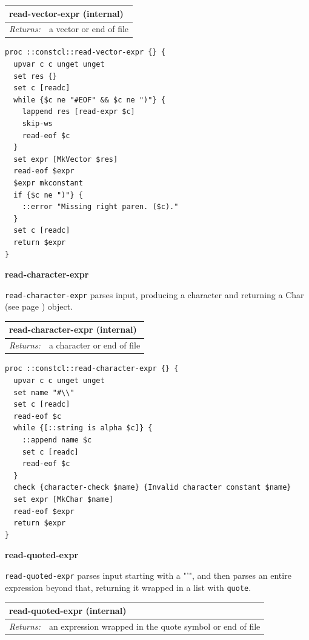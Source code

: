 \documentclass[twoside,9pt]{report}
\begin{document}
\begin{tabular}{ |l l| }
\hline
\multicolumn{2}{|l|}{read-vector-expr (internal)} \\
\hline
\textit{Returns:} & a vector or end of file \\
\hline
\end{tabular}

\noindent\makebox[\linewidth]{\rule{\linewidth}{0.4pt}}
\begin{lstlisting}
proc ::constcl::read-vector-expr {} {
  upvar c c unget unget
  set res {}
  set c [readc]
  while {$c ne "#EOF" && $c ne ")"} {
    lappend res [read-expr $c]
    skip-ws
    read-eof $c
  }
  set expr [MkVector $res]
  read-eof $expr
  $expr mkconstant
  if {$c ne ")"} {
    ::error "Missing right paren. ($c)."
  }
  set c [readc]
  return $expr
}
\end{lstlisting}
\noindent\makebox[\linewidth]{\rule{\linewidth}{0.4pt}}

\textbf{read-character-expr}


\texttt{read-character-expr} parses input, producing a character and returning a Char (see page \pageref{characters}) object.

\begin{tabular}{ |l l| }
\hline
\multicolumn{2}{|l|}{read-character-expr (internal)} \\
\hline
\textit{Returns:} & a character or end of file \\
\hline
\end{tabular}

\noindent\makebox[\linewidth]{\rule{\linewidth}{0.4pt}}
\begin{lstlisting}
proc ::constcl::read-character-expr {} {
  upvar c c unget unget
  set name "#\\"
  set c [readc]
  read-eof $c
  while {[::string is alpha $c]} {
    ::append name $c
    set c [readc]
    read-eof $c
  }
  check {character-check $name} {Invalid character constant $name}
  set expr [MkChar $name]
  read-eof $expr
  return $expr
}
\end{lstlisting}
\noindent\makebox[\linewidth]{\rule{\linewidth}{0.4pt}}

\textbf{read-quoted-expr}


\texttt{read-quoted-expr} parses input starting with a "'", and then parses an entire expression beyond that, returning it wrapped in a list with \texttt{quote}.

\begin{tabular}{ |l l| }
\hline
\multicolumn{2}{|l|}{read-quoted-expr (internal)} \\
\hline
\textit{Returns:} & an expression wrapped in the quote symbol or end of file \\
\hline
\end{tabular}
\end{document}
